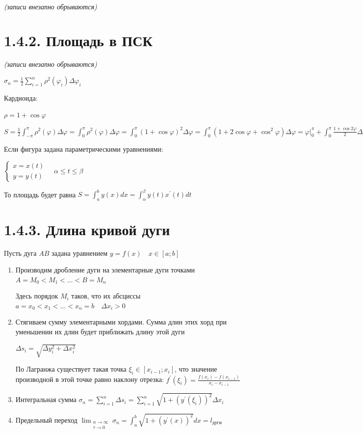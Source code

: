 \documentclass[12pt]{article}
\begin{document}
    \textit{(записи внезапно обрываются)}

    \section{1.4.2. Площадь в ПСК}

    \textit{(записи внезапно обрываются)}

    $\sigma_n = \frac{1}{2} \sum_{i=1}^n \rho^2 (\varphi_i) \Delta \varphi_i$

    \Ex Кардиоида:

    $\rho = 1 + \cos\varphi$

    $S = \frac{1}{2}\int^{\pi}_{-\pi} \rho^2 (\varphi) \Delta \varphi = \int_0^\pi \rho^2 (\varphi) \Delta \varphi =
    \int_0^\pi (1 + \cos\varphi)^2 \Delta \varphi = \int_0^\pi (1 + 2\cos\varphi + \cos^2\varphi) \Delta \varphi =
    \varphi \Big|_0^\pi + \int_0^\pi \frac{1 + \cos2\varphi}{2} \Delta \varphi = \pi + \frac{1}{2}\pi = \frac{3}{2}\pi$

    \Nota Если фигура задана параметрическими уравнениями:

    $\begin{cases}x = x(t) \\ y = y(t)\end{cases} \quad \alpha \leq t \leq \beta$

    То площадь будет равна $S = \int_a^b y(x)dx = \int^\beta_\alpha y(t)x^\prime(t)dt$

    \section{1.4.3. Длина кривой дуги}

    Пусть дуга $AB$ задана уравнением $y = f(x) \quad x \in [a;b]$

    \begin{enumerate}
        \item Производим дробление дуги на элементарные дуги точками $A = M_0 < M_1 < \dots < B = M_n$

        Здесь порядок $M_i$ таков, что их абсциссы $a = x_0 < x_1 < \dots < x_n = b \quad \Delta x_i > 0$

        \item Стягиваем сумму элементарными хордами. Сумма длин этих хорд при уменьшении их длин будет приближать длину этой дуги

        $\Delta s_i = \sqrt{\Delta y^2_i + \Delta x_i^2}$

        По \Ths Лагранжа существует такая точка $\xi_i \in [x_{i-1};x_i]$,
        что значение производной в этой точке равно наклону отрезка: $f^\prime(\xi_i) = \frac{f(x_i) - f(x_{i-1})}{x_i - x_{i-1}}$

        \item Интегральная сумма $\sigma_n = \sum_{i=1}^n \Delta s_i = \sum_{i=1}^n \sqrt{1 + (y^\prime(\xi_i))^2} \Delta x_i$

        \item Предельный переход $\lim_{\substack{n\to\infty \\ \tau \to 0}} \sigma_n = \int_a^b \sqrt{1 + (y^\prime(x))^2} dx = l_\text{дуги}$
    \end{enumerate}
\end{document}
